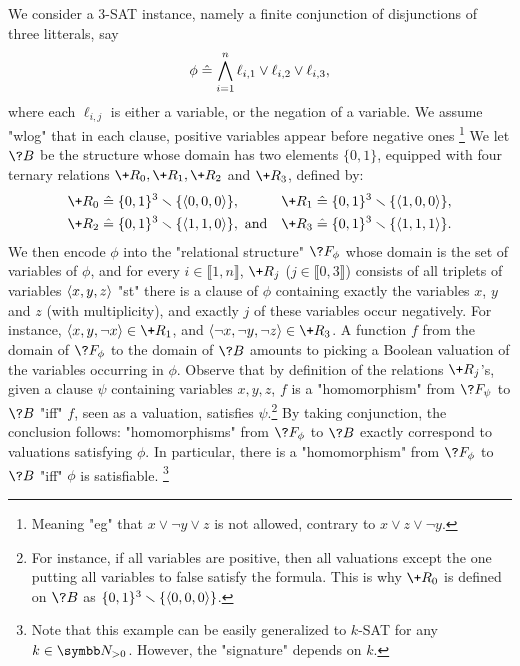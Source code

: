 \begin{example}
	\AP\label{ex:sat-as-hom}
	We consider a 3-SAT instance, namely a finite conjunction of
	disjunctions of three litterals, say
	\[
		\phi \mathrel{\hat{=}} \bigwedge_{i=1}^n \ell_{i,1} \lor \ell_{i,2} \lor \ell_{i,3},
	\]
	where each $\ell_{i,j}$ is either a variable, or the negation of a variable.
	We assume "wlog" that in each clause, positive variables appear before negative ones%
	\footnote{Meaning "eg" that $x \lor \neg y \lor z$ is not allowed, contrary to
	$x \lor z \lor \neg y$.}
	We let $\?B$ be the structure whose domain has two elements $\{0,1\}$,
	equipped with four ternary relations $\+R_0, \+R_1, \+R_2$ and $\+R_3$, defined by:
	\begin{align*}
		\+R_0 & \defeq \set{0,1}^3 \smallsetminus \set{\tup{0,0,0}}, &
		\+R_1 & \defeq \set{0,1}^3 \smallsetminus \set{\tup{1,0,0}}, \\
		\+R_2 & \defeq \set{0,1}^3 \smallsetminus \set{\tup{1,1,0}}, \text{ and} &
		\+R_3 & \defeq \set{0,1}^3 \smallsetminus \set{\tup{1,1,1}}.
	\end{align*}
	We then encode $\phi$ into the "relational structure" $\?F_\phi$
	whose domain is the set of variables of $\phi$,
	and for every $i \in \lBrack 1,n \rBrack$,
	$\+R_j$ ($j\in\lBrack 0,3\rBrack$) consists of all triplets of variables $\langle x,y,z\rangle$
	"st" there is a clause of $\phi$ containing exactly the variables $x$, $y$ and $z$ (with multiplicity), and exactly $j$ of these variables occur negatively.
	For instance, $\tup{x, y, \neg x} \in \+R_1$, and $\tup{\neg x, \neg y, \neg z} \in \+R_3$.
	A function $f$ from the domain of $\?F_\phi$ to the domain of $\?B$ amounts to picking
	a Boolean valuation of the variables occurring in $\phi$.
	Observe that by definition of the relations $\+R_j$'s,
	given a clause $\psi$ containing variables $x,y,z$, 
	$f$ is a "homomorphism" from $\?F_\psi$ to $\?B$ "iff"
	$f$, seen as a valuation, satisfies $\psi$.\footnote{For instance,
	if all variables are positive, then all valuations except the one putting
	all variables to false satisfy the formula. This is why $\+R_0$ is defined
	on $\?B$ as $\{0,1\}^3\smallsetminus \{\langle0,0,0\rangle\}$.}
	By taking conjunction, the conclusion follows: "homomorphisms" from
	$\?F_\phi$ to $\?B$ exactly correspond to valuations satisfying $\phi$.
	In particular, there is a "homomorphism" from $\?F_\phi$ to $\?B$ "iff"
	$\phi$ is satisfiable.%
	\footnote{Note that this example can be easily generalized to $k$-SAT for any $k\in\Np$.
	However, the "signature" depends on $k$.}
\end{example}

